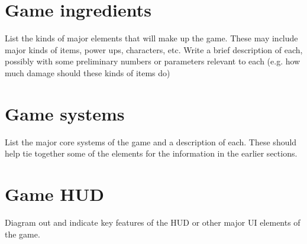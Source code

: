 \documentclass{article}
\begin{document}
\section{Game ingredients}
List the kinds of major elements that will make up the game. These may include major kinds of items, power ups, characters, etc. Write a brief description of each, possibly with some preliminary numbers or parameters relevant to each (e.g. how much damage should these kinds of items do)
\vspace{2in}

\section{Game systems}
List the major core systems of the game and a description of each. These should help tie together some of the elements for the information in the earlier sections. 
\vspace{4in}

\section{Game HUD}
Diagram out and indicate key features of the HUD or other major UI elements of the game.
\vspace{4in}
\end{document}
